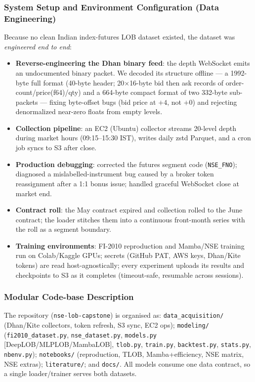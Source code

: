 \documentclass[11pt]{article}
\begin{document}
\subsubsection{System Setup and Environment Configuration (Data Engineering)}
Because no clean Indian index-futures LOB dataset existed, the dataset was \emph{engineered end to end}:
\begin{itemize}[nosep]
  \item \textbf{Reverse-engineering the Dhan binary feed}: the depth WebSocket emits an undocumented binary
        packet. We decoded its structure offline --- a 1992-byte full format (40-byte header; 20$\times$16-byte
        bid then ask records of order-count/price(f64)/qty) and a 664-byte compact format of two 332-byte
        sub-packets --- fixing byte-offset bugs (bid price at $+4$, not $+0$) and rejecting denormalized
        near-zero floats from empty levels.
  \item \textbf{Collection pipeline}: an EC2 (Ubuntu) collector streams 20-level depth during market hours
        (09:15--15:30 IST), writes daily zstd Parquet, and a cron job syncs to S3 after close.
  \item \textbf{Production debugging}: corrected the futures segment code (\texttt{NSE\_FNO}); diagnosed a
        mislabelled-instrument bug caused by a broker token reassignment after a 1:1 bonus issue; handled
        graceful WebSocket close at market end.
  \item \textbf{Contract roll}: the May contract expired and collection rolled to the June contract; the
        loader stitches them into a continuous front-month series with the roll as a segment boundary.
  \item \textbf{Training environments}: FI-2010 reproduction and Mamba/NSE training run on Colab/Kaggle
        GPUs; secrets (GitHub PAT, AWS keys, Dhan/Kite tokens) are read host-agnostically; every experiment
        uploads its results and checkpoints to S3 as it completes (timeout-safe, resumable across sessions).
\end{itemize}

\subsubsection{Modular Code-base Description}
The repository (\texttt{nse-lob-capstone}) is organised as: \texttt{data\_acquisition/} (Dhan/Kite
collectors, token refresh, S3 sync, EC2 ops); \texttt{modeling/} (\texttt{fi2010\_dataset.py},
\texttt{nse\_dataset.py}, \texttt{models.py} [DeepLOB/MLPLOB/MambaLOB], \texttt{tlob.py},
\texttt{train.py}, \texttt{backtest.py}, \texttt{stats.py}, \texttt{nbenv.py}); \texttt{notebooks/}
(reproduction, TLOB, Mamba+efficiency, NSE matrix, NSE extras); \texttt{literature/}; and \texttt{docs/}.
All models consume one data contract, so a single loader/trainer serves both datasets.
\end{document}
